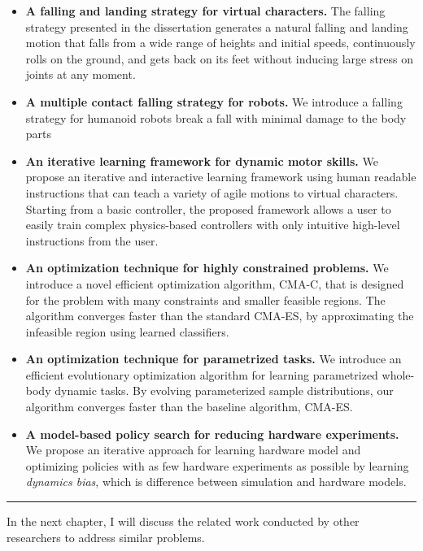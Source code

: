 \begin{itemize}
\item \textbf{A falling and landing strategy for virtual characters.}
  The falling strategy presented in the dissertation generates a natural falling
  and landing motion that falls from a wide range of heights and initial
  speeds, continuously rolls on the ground, and gets back on its feet without
  inducing large stress on joints at any moment.
\item \textbf{A multiple contact falling strategy for robots.}
  We introduce a falling strategy for humanoid robots  break a
  fall with minimal damage to the body parts
\item \textbf{An iterative learning framework for dynamic motor skills.}
  We propose an iterative and interactive learning framework 
  using human readable instructions that can teach a variety of agile motions
  to virtual characters.
  Starting from a basic controller, the proposed framework allows a user 
  to easily train complex physics-based controllers 
  with only intuitive high-level instructions from the user.
\item \textbf{An optimization technique for highly constrained problems.}
  We introduce a novel efficient optimization algorithm, CMA-C, that is 
  designed for the problem with many constraints and smaller feasible regions.
  The algorithm converges faster than the standard CMA-ES,
  by approximating the infeasible region using learned classifiers.
\item \textbf{An optimization technique for parametrized tasks.}
  We introduce an efficient evolutionary optimization algorithm for learning
  parametrized whole-body dynamic tasks.
  By evolving parameterized sample distributions, our algorithm
  converges faster than the baseline algorithm, CMA-ES.
\item \textbf{A model-based policy search for reducing hardware experiments.}
  We propose an iterative approach for learning hardware model and optimizing
  policies with as few hardware experiments as possible by learning
  \emph{dynamics bias}, which is difference between simulation and hardware
  models. 
\end{itemize}

\rule{0.95\textwidth}{1pt}

In the next chapter, I will discuss the related work conducted by other
researchers to address similar problems.

